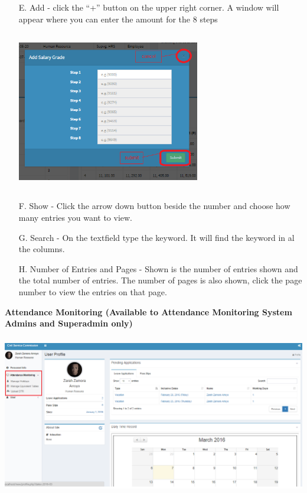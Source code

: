 \begin{itemize}
\begin{enumerate}
		\item[E.] Add - click the “+” button on the upper right corner. A window will appear where you can enter the amount for the 8 steps\\
		\begin{center}
			\includegraphics[width=8cm,height=7cm]{image/addsalarygrade_um.png}
		\end{center} 
		\item[F.] Show - Click the arrow down button beside the number and choose how many entries you want to view.
		\item[G.] Search - On the textfield type the keyword. It will find the keyword in al the columns.
		\item[H.] Number of Entries and Pages - Shown is the number of entries shown and the total number of entries. The number of pages is also shown, click the page number to view the entries on that page.
	\end{enumerate}
\end{itemize}
\newpage
\noindent
\textbf{Attendance Monitoring (Available to Attendance Monitoring System Admins and Superadmin only)\\ }
\begin{center}
	\includegraphics[width=14cm,height=7cm]{image/ams_um.png}
\end{center} 
